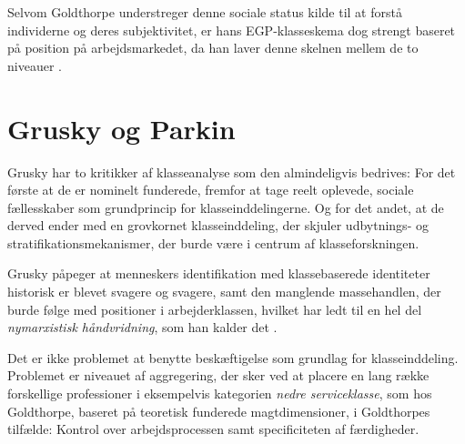 Selvom Goldthorpe understreger denne sociale status kilde til at forstå individerne og deres subjektivitet, er hans EGP-klasseskema dog strengt baseret på position på arbejdsmarkedet, da han laver denne skelnen mellem de to niveauer \parencite[95]{Harrits2014}. 


\section{Grusky og Parkin \label{gruskyogparkin}}

Grusky har to kritikker af klasseanalyse som den almindeligvis bedrives: For det første at de er nominelt funderede, fremfor at tage reelt oplevede, sociale fællesskaber som grundprincip for klasseinddelingerne. Og for det andet, at de derved ender med en grovkornet klasseinddeling, der skjuler udbytnings- og stratifikationsmekanismer, der burde være i centrum af klasseforskningen. 


Grusky påpeger at menneskers identifikation med klassebaserede identiteter historisk er blevet svagere og svagere, samt den manglende massehandlen, der burde følge med positioner i arbejderklassen, hvilket har ledt til en hel del \emph{nymarxistisk håndvridning}, som han kalder det \parencite[205]{Grusky2001}. 

Det er ikke problemet at benytte beskæftigelse som grundlag for klasseinddeling. Problemet er niveauet af aggregering, der sker ved at placere en lang række forskellige professioner i eksempelvis kategorien \emph{nedre serviceklasse}, som hos Goldthorpe, baseret på teoretisk funderede magtdimensioner, i Goldthorpes tilfælde: Kontrol over arbejdsprocessen samt specificiteten af færdigheder. 

